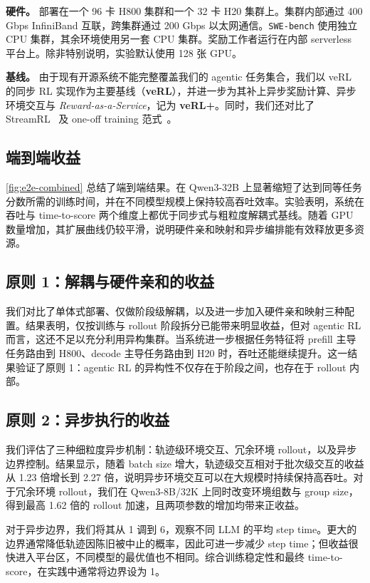 \noindent\textbf{硬件。}
\SystemName{}部署在一个 96 卡 H800 集群和一个 32 卡 H20 集群上。集群内部通过 400 Gbps InfiniBand 互联，跨集群通过 200 Gbps 以太网通信。\texttt{SWE-bench} 使用独立 CPU 集群，其余环境使用另一套 CPU 集群。奖励工作者运行在内部 serverless 平台上。除非特别说明，实验默认使用 128 张 GPU。

\noindent\textbf{基线。}
由于现有开源系统不能完整覆盖我们的 agentic 任务集合，我们以 veRL 的同步 RL 实现作为主要基线（\textbf{veRL}），并进一步为其补上异步奖励计算、异步环境交互与 \textit{Reward-as-a-Service}，记为 \textbf{veRL+}。同时，我们还对比了 StreamRL~\cite{StreamRL} 及 one-off training 范式~\cite{deepscaler2025}。

\subsection{端到端收益}
\label{ssec:e2e-performance}
\autoref{fig:e2e-combined} 总结了端到端结果。\SystemName{}在 Qwen3-32B 上显著缩短了达到同等任务分数所需的训练时间，并在不同模型规模上保持较高吞吐效率。实验表明，系统在吞吐与 time-to-score 两个维度上都优于同步式与粗粒度解耦式基线。随着 GPU 数量增加，其扩展曲线仍较平滑，说明硬件亲和映射和异步编排能有效释放更多资源。

\subsection{原则 1：解耦与硬件亲和的收益}
\label{subsec:eval-disaggregated}
我们对比了单体式部署、仅做阶段级解耦，以及进一步加入硬件亲和映射三种配置。结果表明，仅按训练与 rollout 阶段拆分已能带来明显收益，但对 agentic RL 而言，这还不足以充分利用异构集群。当系统进一步根据任务特征将 prefill 主导任务路由到 H800、decode 主导任务路由到 H20 时，吞吐还能继续提升。这一结果验证了原则 1：agentic RL 的异构性不仅存在于阶段之间，也存在于 rollout 内部。

\subsection{原则 2：异步执行的收益}
\label{subsec:eval-async}
我们评估了三种细粒度异步机制：轨迹级环境交互、冗余环境 rollout，以及异步边界控制。结果显示，随着 batch size 增大，轨迹级交互相对于批次级交互的收益从 1.23 倍增长到 2.27 倍，说明异步环境交互可以在大规模时持续保持高吞吐。对于冗余环境 rollout，我们在 Qwen3-8B/32K 上同时改变环境组数与 group size，得到最高 1.62 倍的 rollout 加速，且两项参数的增加均带来正收益。

对于异步边界，我们将其从 1 调到 6，观察不同 LLM 的平均 step time。更大的边界通常降低轨迹因陈旧被中止的概率，因此可进一步减少 step time；但收益很快进入平台区，不同模型的最优值也不相同。综合训练稳定性和最终 time-to-score，\SystemName{}在实践中通常将边界设为 1。

